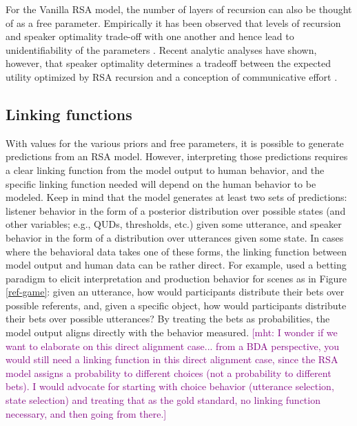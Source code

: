 \documentclass{sp}
\newcommand{\mht}[1]{\textcolor{purple}{[mht: #1]}}
\begin{document}
For the Vanilla RSA model, the number of layers of recursion can also be thought of as a free parameter. Empirically it has been observed that levels of recursion and speaker optimality trade-off with one another  and hence lead to unidentifiability of the parameters \citep{frank2016rational}. Recent analytic analyses have shown, however, that speaker optimality determines a tradeoff between the expected utility optimized by RSA recursion and a conception of communicative effort \citep{zaslavsky2020rate}.

\subsection{Linking functions}

With values for the various priors and free parameters, it is possible to generate predictions from an RSA model. However, interpreting those predictions requires a clear linking function from the model output to human behavior, and the specific linking function needed will depend on the human behavior to be modeled. Keep in mind that the model generates at least two sets of predictions: listener behavior in the form of a posterior distribution over possible states (and other variables; e.g., QUDs, thresholds, etc.) given some utterance, and speaker behavior in the form of a distribution over utterances given some state. In cases where the behavioral data takes one of these forms, the linking function between model output and human data can be rather direct. For example, \cite{frankgoodman2012} used a betting paradigm to elicit interpretation and production behavior for scenes as in Figure \ref{ref-game}: given an utterance, how would participants distribute their bets over possible referents, and, given a specific object, how would participants distribute their bets over possible utterances? By treating the bets as probabilities, the model output aligns directly with the behavior measured. \mht{I wonder if we want to elaborate on this direct alignment case... from a BDA perspective, you would still need a linking function in this direct alignment case, since the RSA model assigns a probability to different choices (not a probability to different bets). I would advocate for starting with choice behavior (utterance selection, state selection)  and treating that as the gold standard, no linking function necessary, and then going from there.}
\end{document}
